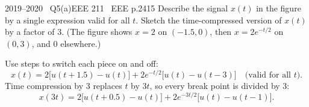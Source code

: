 \begin{qcard}{2019--2020 \textbullet\ Q5(a)}{EEE 211 \textbullet\ EEE p.24}{15}
Describe the signal $x(t)$ in the figure by a single expression valid for all $t$. Sketch the time-compressed version of $x(t)$ by a factor of 3. (The figure shows $x=2$ on $(-1.5,0)$, then $x=2e^{-t/2}$ on $(0,3)$, and $0$ elsewhere.)
\end{qcard}
\begin{solution}
Use steps to switch each piece on and off:
\[
x(t)=2\big[u(t+1.5)-u(t)\big]+2e^{-t/2}\big[u(t)-u(t-3)\big]\quad\text{(valid for all }t).
\]
Time compression by 3 replaces $t$ by $3t$, so every break point is divided by 3:
\[
x(3t)=2\big[u(t+0.5)-u(t)\big]+2e^{-3t/2}\big[u(t)-u(t-1)\big].
\]
\begin{center}
\end{center}
\end{solution}

